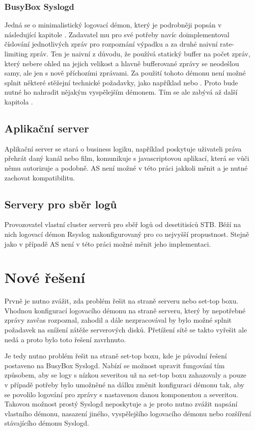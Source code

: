 \documentclass[thesis=B,czech]{FITthesis}[2012/06/26]
\begin{document}
\subsubsection{BusyBox Syslogd}
Jedná se o minimalistický logovací démon, který je podrobněji popsán v následující kapitole .
Zadavatel mu pro své potřeby navíc doimplementoval číslování jednotlivých zpráv pro rozpoznání výpadku a za druhé naivní rate-limiting zpráv. Ten je naivní z důvodu, že používá statický buffer na počet zpráv, který nebere ohled na jejich velikost a hlavně bufferované zprávy se neodešlou samy, ale jen s nově příchozími zprávami.
Za použití tohoto démonu není možné splnit některé stěžejní technické požadavky, jako například  nebo . Proto bude nutné ho nahradit nějakým vyspělejším démonem. Tím se ale zabývá až další kapitola .

\subsection{Aplikační server}
Aplikační server se stará o business logiku, například poskytuje uživateli práva přehrát daný kanál nebo film, komunikuje s javascriptovou aplikací, která se vůči němu autorizuje a podobně.
AS není možné v této práci jakkoli měnit a je nutné zachovat kompatibilitu.

\subsection{Servery pro sběr logů}
Provozovatel vlastní cluster serverů pro sběř logů od desetitisíců STB. Běží na nich logovací démon Rsyslog nakonfigurovaný pro co nejvyšší propustnost. Stejně jako v případě AS není v této práci možné měnit jeho implementaci.

\section{Nové řešení}
Prvně je nutno zvážit, zda problém řešit na straně serveru nebo set-top boxu. Vhodnou konfigurací logovacího démonu na straně serveru, který by nepotřebné zprávy zavčas rozpoznal, zahodil a dále nezpracovával by bylo možné splnit požadavek na snížení zátěže serverových disků. Přetížení sítě se takto vyřešit ale nedá a proto bylo toto řešení zavrhnuto.

Je tedy nutno problém řešit na straně set-top boxu, kde je původní řešení postaveno na BusyBox Syslogd. Nabízí se možnost upravit fungování tím způsobem, aby se logy s nízkou severitou už na set-top boxu zahazovaly a pouze v případě potřeby bylo umožněné na dálku změnit konfiguraci démonu tak, aby se povolilo logování pro zprávy s nastavenou danou komponentou a severitou. Takovou možnost prostý Syslogd neposkytuje a je proto nutno zvážit napsání vlastního démonu, nasazení jiného, vyspělejšího logovacího démonu nebo rozšíření stávajícího démonu Syslogd.
\end{document}
